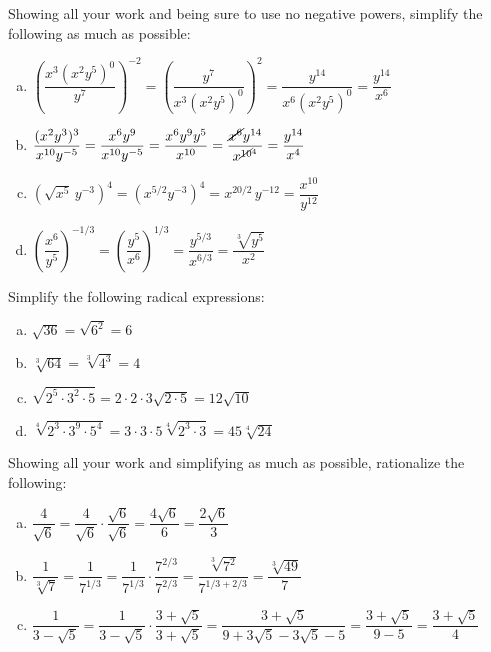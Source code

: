 \documentclass[12pt,letterpaper]{exam}
\begin{document}
\begin{questions}
\question[8] Showing all your work and being sure to use no negative powers, simplify the following as much as possible: \pspace
	\begin{enumerate}[(a)]
	\item $\left( \dfrac{x^3 (x^2y^5)^0}{y^7} \right)^{-2}= \left( \dfrac{y^7}{x^3 (x^2y^5)^0} \right)^2= \dfrac{y^{14}}{x^6 (x^2y^5)^0}= \dfrac{y^{14}}{x^6}$ \vfill
	\item $\dfrac{(x^2 y^3)^3}{x^{10} y^{-5}}= \dfrac{x^6 y^9}{x^{10} y^{-5}}= \dfrac{x^6 y^9 y^5}{x^{10}}= \dfrac{\cancel{x^6} y^{14}}{x^{\cancel{10}^4}}= \dfrac{y^{14}}{x^4}$ \vfill
	\item $(\sqrt{x^5}\, y^{-3})^4= (x^{5/2} y^{-3})^4= x^{20/2}\, y^{-12}= \dfrac{x^{10}}{y^{12}}$ \vfill
	\item $\left( \dfrac{x^6}{y^5} \right)^{-1/3}= \left( \dfrac{y^5}{x^6} \right)^{1/3}= \dfrac{y^{5/3}}{x^{6/3}}= \dfrac{\sqrt[3]{y^5}}{x^2}$ \vfill
	\end{enumerate}



\newpage



\question[8] Simplify the following radical expressions: \pspace
	\begin{enumerate}[(a)]
	\item $\sqrt{36}= \sqrt{6^2}= 6$ \vfill
	\item $\sqrt[3]{64}= \sqrt[3]{4^3}= 4$ \vfill
	\item $\sqrt{2^5 \cdot 3^2 \cdot 5}= 2 \cdot 2 \cdot 3 \sqrt{2 \cdot 5}= 12 \sqrt{10}$ \vfill
	\item $\sqrt[4]{2^3 \cdot 3^9 \cdot 5^4}= 3 \cdot 3 \cdot 5 \sqrt[4]{2^3 \cdot 3}= 45 \sqrt[4]{24}$ \vfill
	\end{enumerate}



\newpage



\question[6] Showing all your work and simplifying as much as possible, rationalize the following: \pspace
	\begin{enumerate}[(a)]
	\item $\dfrac{4}{\sqrt{6}}= \dfrac{4}{\sqrt{6}} \cdot \dfrac{\sqrt{6}}{\sqrt{6}}= \dfrac{4 \sqrt{6}}{6}= \dfrac{2 \sqrt{6}}{3}$ \vfill
	\item $\dfrac{1}{\sqrt[3]{7}}= \dfrac{1}{7^{1/3}}= \dfrac{1}{7^{1/3}} \cdot \dfrac{7^{2/3}}{7^{2/3}}= \dfrac{\sqrt[3]{7^2}}{7^{1/3 + 2/3}}= \dfrac{\sqrt[3]{49}}{7}$ \vfill
	\item $\dfrac{1}{3 - \sqrt{5}}= \dfrac{1}{3 - \sqrt{5}} \cdot \dfrac{3 + \sqrt{5}}{3 + \sqrt{5}}= \dfrac{3 + \sqrt{5}}{9 + 3 \sqrt{5} - 3 \sqrt{5} - 5}= \dfrac{3 + \sqrt{5}}{9 - 5}= \dfrac{3 + \sqrt{5}}{4}$ \vfill
	\end{enumerate}




\end{questions}
\end{document}

